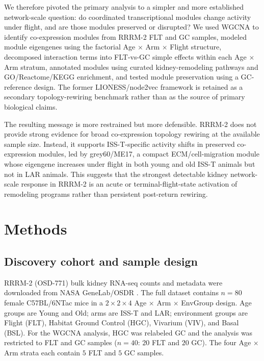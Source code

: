 \documentclass[11pt]{article}
\begin{document}
We therefore pivoted the primary analysis to a simpler and more established network-scale question: do coordinated transcriptional modules change activity under flight, and are those modules preserved or disrupted? We used WGCNA to identify co-expression modules from RRRM-2 FLT and GC samples, modeled module eigengenes using the factorial Age $\times$ Arm $\times$ Flight structure, decomposed interaction terms into FLT-vs-GC simple effects within each Age $\times$ Arm stratum, annotated modules using curated kidney-remodeling pathways and GO/Reactome/KEGG enrichment, and tested module preservation using a GC-reference design. The former LIONESS/node2vec framework is retained as a secondary topology-rewiring benchmark rather than as the source of primary biological claims.

The resulting message is more restrained but more defensible. RRRM-2 does not provide strong evidence for broad co-expression topology rewiring at the available sample size. Instead, it supports ISS-T-specific activity shifts in preserved co-expression modules, led by grey60/ME17, a compact ECM/cell-migration module whose eigengene increases under flight in both young and old ISS-T animals but not in LAR animals. This suggests that the strongest detectable kidney network-scale response in RRRM-2 is an acute or terminal-flight-state activation of remodeling programs rather than persistent post-return rewiring.

\section{Methods}

\subsection{Discovery cohort and sample design}

RRRM-2 (OSD-771) bulk kidney RNA-seq counts and metadata were downloaded from NASA GeneLab/OSDR \citep{ray2019genelab}. The full dataset contains $n=80$ female C57BL/6NTac mice in a $2\times2\times4$ Age $\times$ Arm $\times$ EnvGroup design. Age groups are Young and Old; arms are ISS-T and LAR; environment groups are Flight (FLT), Habitat Ground Control (HGC), Vivarium (VIV), and Basal (BSL). For the WGCNA analysis, HGC was relabeled GC and the analysis was restricted to FLT and GC samples ($n=40$: $20$ FLT and $20$ GC). The four Age $\times$ Arm strata each contain $5$ FLT and $5$ GC samples.
\end{document}
